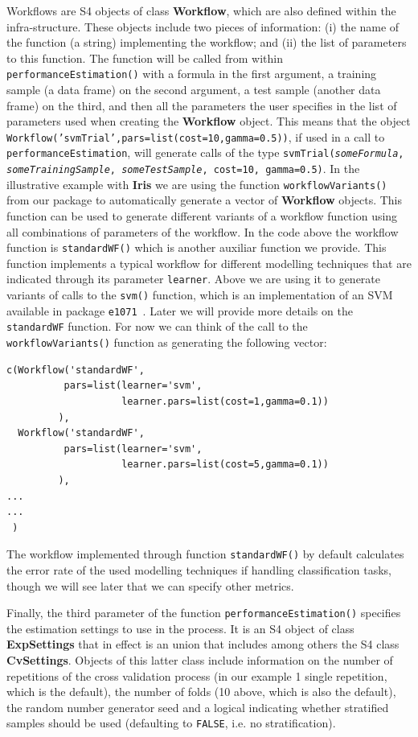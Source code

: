 \documentclass[10pt,a4paper]{article}\usepackage[]{graphicx}\usepackage[]{color}
\begin{document}
Workflows are S4 objects of class \textbf{Workflow}, which are also
defined within the infra-structure. These objects include two pieces
of information: (i) the name of the function (a string) implementing the
workflow; and (ii) the list of parameters to this function. The
function will be called from within 
\texttt{performanceEstimation()}  with a formula in the first
argument, a training sample (a data frame) on the second argument, a
test sample (another data frame) on the third, and then all the parameters
the user specifies in the list of parameters used when creating the
\textbf{Workflow} object. This means that the object
\texttt{Workflow('svmTrial',pars=list(cost=10,gamma=0.5))}, if used in a
call to \texttt{performanceEstimation}, will 
 generate calls of the type
\texttt{svmTrial(\textit{someFormula}, \textit{someTrainingSample}, \textit{someTestSample}, cost=10,
  gamma=0.5)}. In the illustrative example with \textbf{Iris} we are using the function \texttt{workflowVariants()} from our package to automatically
generate a vector of \textbf{Workflow} objects. This function can be used
to generate different variants of a workflow function using all
combinations of parameters of the workflow. In the code
above the workflow function is \texttt{standardWF()} which is another
auxiliar function we provide. This function implements a typical
workflow for different modelling techniques that are indicated through
its parameter \texttt{learner}. Above we are using it to generate
variants of calls to the \texttt{svm()} function, which is an implementation of an SVM available in package \texttt{e1071}~\cite{}.  Later we will provide
more details on the \texttt{standardWF} function. For now we can think of the call
to the \texttt{workflowVariants()} function as generating the following vector:\linebreak
\begin{verbatim}
c(Workflow('standardWF',
          pars=list(learner='svm',
                    learner.pars=list(cost=1,gamma=0.1))
         ), 
  Workflow('standardWF',
          pars=list(learner='svm',
                    learner.pars=list(cost=5,gamma=0.1))
         ),
...
...
 ) 
\end{verbatim}
 
The workflow implemented through function \texttt{standardWF()} by
default calculates the error rate of the used modelling techniques if
handling classification tasks, though we will see later that we can
specify other metrics.

Finally, the third parameter of the function
\texttt{performanceEstimation()} specifies the estimation settings
to use in the process. It is an S4 object of class
\textbf{ExpSettings} that in effect is an union that includes among
others the S4 class \textbf{CvSettings}. Objects of this latter class
include information on the number of repetitions of the cross
validation process (in our example 1 single repetition, which is the
default), the number of folds (10 above, which is also the default),
the random number generator seed and a logical indicating whether stratified
samples should be used (defaulting to \texttt{FALSE}, i.e. no stratification).
\end{document}
